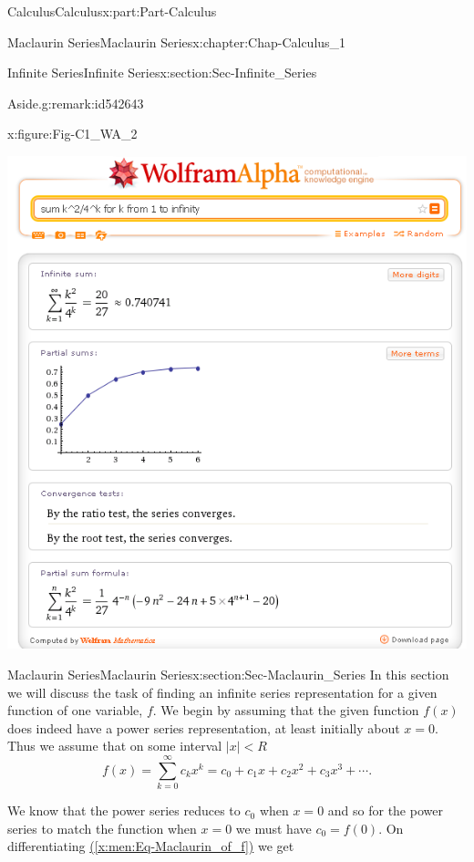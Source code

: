 \documentclass[oneside,10pt,]{book}
\newcommand{\xreffont}{\relax}
\numberwithin{equation}{section}
\begin{document}
\begin{partptx}{Calculus}{}{Calculus}{}{}{x:part:Part-Calculus}
\begin{chapterptx}{Maclaurin Series}{}{Maclaurin Series}{}{}{x:chapter:Chap-Calculus_1}
\begin{sectionptx}{Infinite Series}{}{Infinite Series}{}{}{x:section:Sec-Infinite_Series}
\begin{remark}{Aside.}{g:remark:id542643}
\begin{figureptx}{}{x:figure:Fig-C1_WA_2}{}
\begin{image}{0.05}{0.9}{0.05}
\includegraphics[width=\linewidth]{./Calculus/Images/1/C1_WA_2.png}
\end{image}%
\tcblower
\end{figureptx}%
\end{remark}
\end{sectionptx}
%
%
\typeout{************************************************}
\typeout{************************************************}
%
\begin{sectionptx}{Maclaurin Series}{}{Maclaurin Series}{}{}{x:section:Sec-Maclaurin_Series}
In this section we will discuss the task of finding an infinite series representation for a given function of one variable, \(f\). We begin by assuming that the given function \(f(x)\) does indeed have a power series representation, at least initially about \(x=0\). Thus we assume that on some interval \(|x| < R\)%
\begin{equation}
f(x) = \sum_{k=0}^{\infty}c_kx^k = c_0 + c_1x +c_2x^2 +c_3x^3 + \cdots.\label{x:men:Eq-Maclaurin_of_f}
\end{equation}
%
\par
We know that the power series reduces to \(c_0\) when \(x=0\) and so for the power series to match the function when \(x=0\) we must have \(c_0 = f(0)\). On differentiating \hyperref[x:men:Eq-Maclaurin_of_f]{({\xreffont\ref{x:men:Eq-Maclaurin_of_f}})} we get%

\end{sectionptx}
\end{chapterptx}
\end{partptx}
\end{document}
